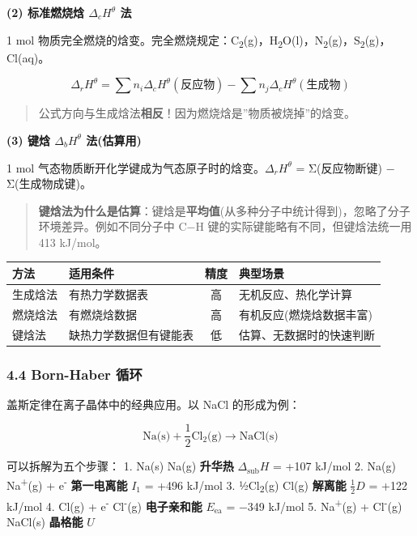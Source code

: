 \textbf{(2) 标准燃烧焓 \(\Delta_c H^\theta\) 法}

1 mol 物质完全燃烧的焓变。完全燃烧规定：C\textsubscript{2}(g)，H\textsubscript{2}O(l)，N\textsubscript{2}(g)，S\textsubscript{2}(g)，Cl(aq)。

\[
\Delta_r H^\theta = \sum n_i \Delta_c H^\theta(\text{反应物}) - \sum n_j \Delta_c H^\theta(\text{生成物})
\]

\begin{quote}
公式方向与生成焓法\textbf{相反}！因为燃烧焓是''物质被烧掉''的焓变。
\end{quote}

\textbf{(3) 键焓 \(\Delta_b H^\theta\) 法(估算用)}

1 mol 气态物质断开化学键成为气态原子时的焓变。\(\Delta_r H^\theta\) = Σ(反应物断键) − Σ(生成物成键)。

\begin{quote}
\textbf{键焓法为什么是估算}：键焓是\textbf{平均值}(从多种分子中统计得到)，忽略了分子环境差异。例如不同分子中 C−H 键的实际键能略有不同，但键焓法统一用 413 kJ/mol。
\end{quote}

{\def\LTcaptype{none} %
\begin{longtable}[]{@{}llcl@{}}
\toprule\noalign{}
方法 & 适用条件 & 精度 & 典型场景 \\
\midrule\noalign{}
\endhead
\bottomrule\noalign{}
\endlastfoot
生成焓法 & 有热力学数据表 & 高 & 无机反应、热化学计算 \\
燃烧焓法 & 有燃烧焓数据 & 高 & 有机反应(燃烧焓数据丰富) \\
键焓法 & 缺热力学数据但有键能表 & 低 & 估算、无数据时的快速判断 \\
\end{longtable}
}

\subsubsection{4.4 Born-Haber 循环}\label{born-haber-ux5faaux73af}

盖斯定律在离子晶体中的经典应用。以 NaCl 的形成为例：

\[\text{Na(s)} + \frac{1}{2}\text{Cl}_2\text{(g)} \to \text{NaCl(s)}\]

可以拆解为五个步骤：
1. Na(s) \箭 Na(g) \textbf{升华热} \(\Delta_{\text{sub}}H\) = +107 kJ/mol
2. Na(g) \箭 Na\textsuperscript{+}(g) + e\textsuperscript{-} \textbf{第一电离能} \(I_1\) = +496 kJ/mol
3. ½Cl\textsubscript{2}(g) \箭 Cl(g) \textbf{解离能} \(\frac{1}{2}D\) = +122 kJ/mol
4. Cl(g) + e\textsuperscript{-} \箭 Cl\textsuperscript{-}(g) \textbf{电子亲和能} \(E_{\text{ea}}\) = −349 kJ/mol
5. Na\textsuperscript{+}(g) + Cl\textsuperscript{-}(g) \箭 NaCl(s) \textbf{晶格能} \(U\)

